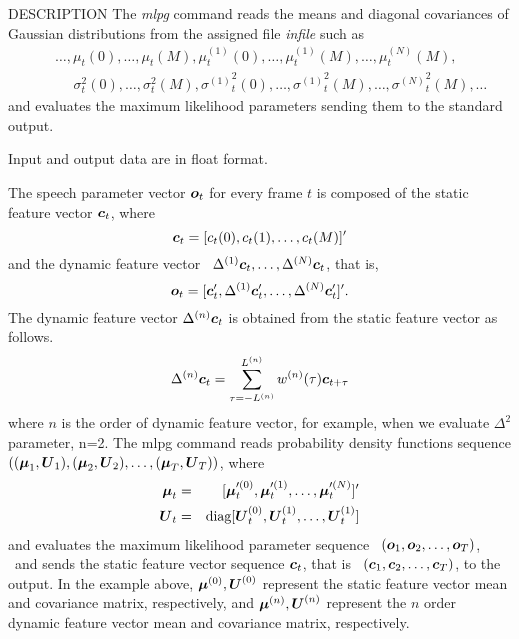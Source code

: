 \begin{qsection}{DESCRIPTION}
        The {\em mlpg} command reads the means and diagonal covariances
        of Gaussian distributions from the assigned file {\em infile}
        such as
 \begin{eqnarray}
	&& \ldots, \mu_t(0), \ldots, \mu_t(M),
		\mu^{(1)}_t(0), \ldots, \mu^{(1)}_t(M),
		\ldots, \mu^{(N)}_t(M),
		\nonumber\\
	&& ~~~~~~\sigma^2_t(0), \ldots, \sigma^2_t(M),
		{\sigma^{(1)}}^2_t(0), \ldots, {\sigma^{(1)}}^2_t(M),
		\ldots, {\sigma^{(N)}}^2_t(M),
		\ldots \nonumber
 \end{eqnarray}
        and evaluates the maximum likelihood parameters
        sending them to the standard output.

	Input and output data are in float format.

        The speech parameter vector $\mbox{\boldmath{$o$}}_t$ for
        every frame $t$ is composed of the static feature
        vector $\mbox{\boldmath{$c$}}_t$, where 
 \begin{displaymath}
	\mbox{\boldmath{$c$}}_t = [c_t(0), c_t(1), \ldots, c_t(M)]'
 \end{displaymath}
	and the dynamic feature vector 
	\ $\Delta^{(1)}\mbox{\boldmath{$c$}}_t, \ldots, \Delta^{(N)}\mbox{\boldmath{$c$}}_t$,
	that is,
 \begin{displaymath}
	\mbox{\boldmath{$o$}}_t = [\mbox{\boldmath{$c$}}_t', \Delta^{(1)}\mbox{\boldmath{$c$}}_t', \ldots, \Delta^{(N)}\mbox{\boldmath{$c$}}_t']'.
 \end{displaymath}
        The dynamic feature vector $\Delta^{(n)}\mbox{\boldmath{$c$}}_t$ is
        obtained from the static feature vector as follows.
 \begin{displaymath}
	\Delta^{(n)}\mbox{\boldmath{$c$}}_t 
	= \sum_{\tau=-L^{(n)}}^{L^{(n)}} w^{(n)}(\tau)\mbox{\boldmath{$c$}}_{t+\tau}
 \end{displaymath}
        where $n$ is the order of dynamic feature vector, for
        example, when we evaluate $\Delta^2$ parameter, n=2.
        The mlpg command reads probability density functions
	sequence
	$\left((\mbox{\boldmath{$\mu$}}_1, \mbox{\boldmath{$U$}}_1), (\mbox{\boldmath{$\mu$}}_2, \mbox{\boldmath{$U$}}_2), \ldots, (\mbox{\boldmath{$\mu$}}_T, \mbox{\boldmath{$U$}}_T)
	\right)$, where
 \begin{eqnarray}
	\mbox{\boldmath{$\mu$}}_t 
	& = & [\mbox{\boldmath{$\mu$}}^{\prime(0)}_t, \mbox{\boldmath{$\mu$}}^{\prime(1)}_t, 
		\ldots, \mbox{\boldmath{$\mu$}}^{\prime(N)}_t]'
		\nonumber\\
	\mbox{\boldmath{$U$}}_t 
	& = & \mbox{diag}[\mbox{\boldmath{$U$}}^{(0)}_t, \mbox{\boldmath{$U$}}^{(1)}_t, \ldots, \mbox{\boldmath{$U$}}^{(1)}_t]
		\nonumber
 \end{eqnarray}
	and evaluates the maximum likelihood parameter sequence
	\ $(\mbox{\boldmath{$o$}}_1, \mbox{\boldmath{$o$}}_2, \ldots, \mbox{\boldmath{$o$}}_T)$,
	\ and sends the static feature vector sequence $\mbox{\boldmath{$c$}}_t$,
        that is
	\ $(\mbox{\boldmath{$c$}}_1, \mbox{\boldmath{$c$}}_2, \ldots, \mbox{\boldmath{$c$}}_T)$,
	to the output.
	In the example above,
	$\mbox{\boldmath{$\mu$}}^{(0)}, \mbox{\boldmath{$U$}}^{(0)}$ represent the static feature vector
        mean and covariance matrix, respectively,
        and $\mbox{\boldmath{$\mu$}}^{(n)}, \mbox{\boldmath{$U$}}^{(n)}$ represent the $n$ order dynamic
        feature vector mean and covariance matrix, respectively.
\end{qsection}

